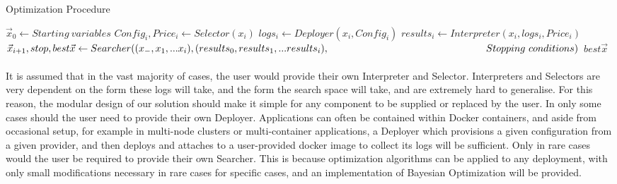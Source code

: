 \documentclass{report}
\begin{document}
\begin{algorithm}
\caption{Optimization Procedure}
\label{alg:Optimization}
\begin{algorithmic}
\State $\vec{x}_{0}\gets Starting \ variables$
\State $Config_i, Price_i\gets Selector(x_i)$
\State $logs_i \gets Deployer(x_i, Config_i)$
\State $results_i \gets Interpreter(x_i, logs_i, Price_i)$
\State $\vec{x}_{i+1}, stop, best\vec{x} \gets Searcher((x_-, x_1,...x_i), (results_0, results_1,...results_i),\newline
\hspace*{5.6cm}Stopping\ conditions)$
\State \Return $best\vec{x}$
\EndIf
\EndFor
\EndProcedure
\end{algorithmic}
\end{algorithm}
 

\paragraph{}
It is assumed that in the vast majority of cases, the user would provide their own Interpreter and Selector. Interpreters and Selectors are very dependent on the form these logs will take, and the form the search space will take, and are extremely hard to generalise. For this reason, the modular design of our solution should make it simple for any component to be supplied or replaced by the user. In only some cases should the user need to provide their own Deployer. Applications can often be contained within Docker containers, and aside from occasional setup, for example in multi-node clusters or multi-container applications, a Deployer which provisions a given configuration from a given provider, and then deploys and attaches to a user-provided docker image to collect its logs will be sufficient.  Only in rare cases would the user be required to provide their own Searcher. This is because optimization algorithms can be applied to any deployment, with only small modifications necessary in rare cases for specific cases, and an implementation of Bayesian Optimization will be provided. 
\end{document}
